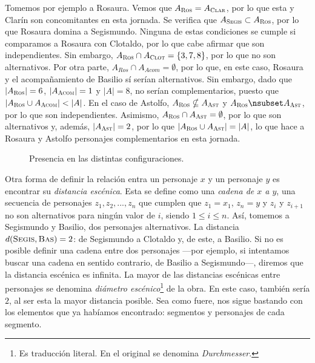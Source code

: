 Tomemos por ejemplo a Rosaura. Vemos que $A_{\textsc{Ros}} = A_{\textsc{Clar}}$, por lo que esta y Clarín son concomitantes en esta jornada. Se verifica que   $A_{\textsc{Segis}} \subset A_{\textsc{Ros}}$, por lo que Rosaura domina a Segismundo. Ninguna de estas condiciones se cumple si comparamos a Rosaura con Clotaldo, por lo que cabe afirmar que son independientes. Sin embargo, $A_{\textsc{Ros}} \cap A_{\textsc{Clot}} = \{3, 7,8\}$, por lo que no son alternativos. Por otra parte, $A_{Ros} \cap A_{Acom} = \emptyset$, por lo que, en este caso, Rosaura y el acompañamiento de Basilio sí serían alternativos. Sin embargo, dado que $\lvert A_{\textsc{Ros}}\rvert = 6$, $\lvert A_{\textsc{Acom}}\rvert = 1$ y $\lvert A\rvert = 8$, no serían complementarios, puesto que  $\lvert A_{\textsc{Ros}} \cup A_{\textsc{Acom}} \rvert < \lvert A \rvert$. En el caso de Astolfo, $A_{\textsc{Ros}} \nsubseteq A_{\textsc{Ast}}$ y $A_{\textsc{Ros}} \nsubset A_{\textsc{Ast}}$, por lo que son independientes. Asimismo, $A_{\textsc{Ros}} \cap A_{\textsc{Ast}} = \emptyset$, por lo que son alternativos y, además, $\lvert A_{\textsc{Ast}}\rvert = 2$, por lo que $\lvert A_{\textsc{Ros}} \cup A_{\textsc{Ast}} \rvert = \lvert A \rvert$, lo que hace a Rosaura y Astolfo personajes complementarios en esta jornada.

\begin{figure}[!ht]
	\centering\small
	
	\caption{Presencia en las distintas configuraciones.}
	\label{fig:dramacuatro}
\end{figure}

Otra forma de definir la relación entra un personaje $x$ y un personaje $y$ es encontrar su \textit{distancia escénica}. Esta se define como una \textit{cadena de $x$ a $y$}, una secuencia de personajes $z_1, z_2, ..., z_n$ que cumplen que $z_1=x_1$, $z_n=y$ y $z_i$ y $z_{i+1}$ no son alternativos para ningún valor de $i$, siendo $1 \leq i \leq n$. Así, tomemos a Segismundo y Basilio, dos personajes alternativos. La distancia $d(\textsc{Segis}, \textsc{Bas}) = 2$: de Segismundo a Clotaldo y, de este, a Basilio. Si no es posible definir una cadena entre dos personajes —\nolinebreak por ejemplo, si intentamos buscar una cadena en sentido contrario, de Basilio a Segismundo\nolinebreak—\nolinebreak, diremos que la distancia escénica es infinita. La mayor de las distancias escénicas entre personajes se denomina \textit{diámetro escénico}\footnote{Es traducción literal. En el original se denomina \textit{Durchmesser}.} de la obra. En este caso, también sería $2$, al ser esta la mayor distancia posible. Sea como fuere, nos sigue bastando con los elementos que ya habíamos encontrado: segmentos y personajes de cada segmento.

